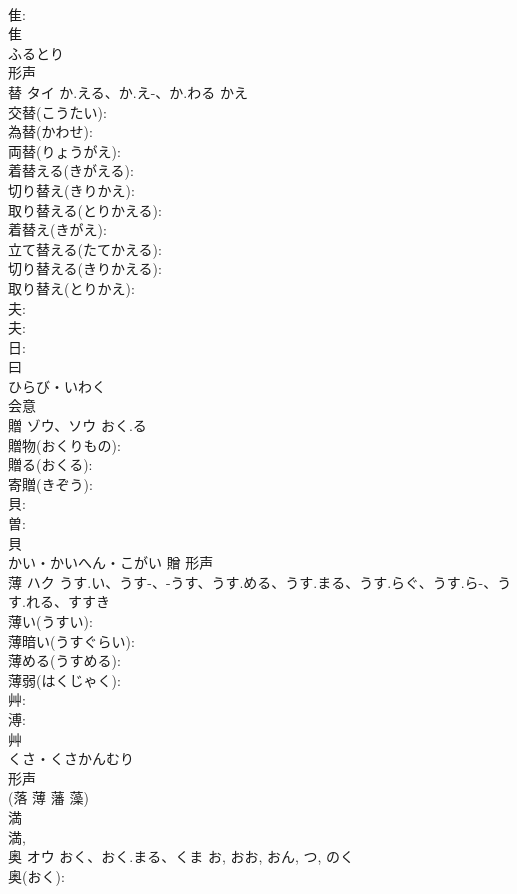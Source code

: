 \documentclass[8pt]{extreport}
\begin{document}
\begin{CJK}{UTF8}{min}
\\	隹: 
\\	隹	
\\	ふるとり	
\\	形声 
\\	替	タイ	か.える、か.え-、か.わる	かえ	
\\	交替(こうたい): 
\\	為替(かわせ): 
\\	両替(りょうがえ): 
\\	着替える(きがえる): 
\\	切り替え(きりかえ): 
\\	取り替える(とりかえる): 
\\	着替え(きがえ): 
\\	立て替える(たてかえる): 
\\	切り替える(きりかえる): 
\\	取り替え(とりかえ): 
\\	夫: 
\\	夫: 
\\	日: 
\\	曰	
\\	ひらび・いわく	
\\	会意 
\\	贈	ゾウ、ソウ	おく.る		
\\	贈物(おくりもの): 
\\	贈る(おくる): 
\\	寄贈(きぞう): 
\\	貝: 
\\	曽: 
\\	貝	
\\	かい・かいへん・こがい	贈	形声 
\\	薄	ハク	うす.い、うす-、-うす、うす.める、うす.まる、うす.らぐ、うす.ら-、うす.れる、すすき		
\\	薄い(うすい): 
\\	薄暗い(うすぐらい): 
\\	薄める(うすめる): 
\\	薄弱(はくじゃく): 
\\	艸: 
\\	溥: 
\\	艸	
\\	くさ・くさかんむり	
\\	形声 
\\	(落 薄 藩 藻) 
\\	満 
\\	満, 
\\	奥	オウ	おく、おく.まる、くま	お, おお, おん, つ, のく	
\\	奥(おく): 

\end{CJK}
\end{document}
